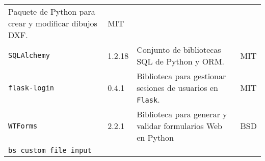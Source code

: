 \begin{longtable}[]{@{}llll@{}}
\begin{minipage}[t]{0.49\columnwidth}
Paquete de Python para crear y modificar dibujos DXF.\strut
\end{minipage} & \begin{minipage}[t]{0.11\columnwidth}\raggedright\strut
MIT\strut
\end{minipage}\tabularnewline
\begin{minipage}[t]{0.18\columnwidth}\raggedright\strut
\texttt{SQLAlchemy}\strut
\end{minipage} & \begin{minipage}[t]{0.08\columnwidth}\raggedright\strut
1.2.18\strut
\end{minipage} & \begin{minipage}[t]{0.49\columnwidth}\raggedright\strut
Conjunto de bibliotecas SQL de Python y ORM.\strut
\end{minipage} & \begin{minipage}[t]{0.11\columnwidth}\raggedright\strut
MIT\strut
\end{minipage}\tabularnewline
\begin{minipage}[t]{0.18\columnwidth}\raggedright\strut
\texttt{flask-login}\strut
\end{minipage} & \begin{minipage}[t]{0.08\columnwidth}\raggedright\strut
0.4.1\strut
\end{minipage} & \begin{minipage}[t]{0.49\columnwidth}\raggedright\strut
Biblioteca para gestionar sesiones de usuarios en \texttt{Flask}.\strut
\end{minipage} & \begin{minipage}[t]{0.11\columnwidth}\raggedright\strut
MIT\strut
\end{minipage}\tabularnewline
\begin{minipage}[t]{0.18\columnwidth}\raggedright\strut
\texttt{WTForms}\strut
\end{minipage} & \begin{minipage}[t]{0.08\columnwidth}\raggedright\strut
2.2.1\strut
\end{minipage} & \begin{minipage}[t]{0.49\columnwidth}\raggedright\strut
Biblioteca para generar y validar formularios Web en Python\strut
\end{minipage} & \begin{minipage}[t]{0.11\columnwidth}\raggedright\strut
BSD\strut
\end{minipage}\tabularnewline
\begin{minipage}[t]{0.18\columnwidth}\raggedright\strut
\texttt{bs custom file input}\strut

\end{minipage}
\end{longtable}
